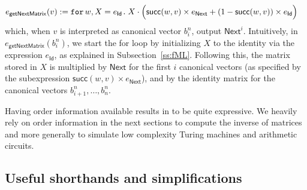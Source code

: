 \begin{align*}
e_{\mathsf{getNextMatrix}}(v)&:=\texttt{for}\, w,X = e_\mathsf{Id} \texttt{.}\,  X \cdot \Big( \mathsf{succ}(w,v)\times e_{\mathsf{Next}} + (1 - \mathsf{succ}(w,v))\times e_{\mathsf{Id}} \Big)
\end{align*}
which, when $v$ is interpreted as canonical vector $b_i^n$, output %
$\mathsf{Next}^i$. %
Intuitively, in $e_{\mathsf{getNextMatrix}}(b_i^n)$, we start the for loop by initializing $X$ to the identity via the expression $e_{\mathsf{Id}}$, as explained in Subsection~\ref{ss:fML}. Following this, the matrix stored in $X$ is multiplied by $\mathsf{Next}$ for the first $i$ canonical vectors (as specified by the subexpression $\mathsf{succ}(w,v)\times e_{\mathsf{Next}}$), and by the identity matrix for the canonical vectors $b_{i+1}^n, \ldots , b_n^n$. 


Having order information available results in \langfor to be quite expressive.
We heavily rely on order information in the next sections to compute the inverse of matrices and more generally to simulate low complexity Turing machines and arithmetic circuits.


\subsection{Useful shorthands and simplifications}\label{sec:queries:simp}

